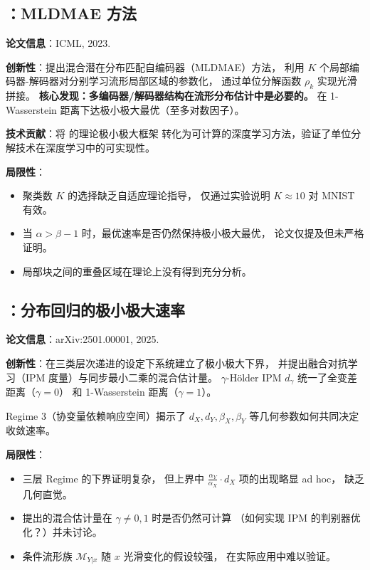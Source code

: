 \subsection{\citep{tang2023lowdim}：MLDMAE 方法}\label{sec:ch0-icml2023}

\textbf{论文信息}：ICML, 2023.

\textbf{创新性}：提出混合潜在分布匹配自编码器（MLDMAE）方法，
利用 $K$ 个局部编码器-解码器对分别学习流形局部区域的参数化，
通过单位分解函数 $\rho_k$ 实现光滑拼接。
\textbf{核心发现：多编码器/解码器结构在流形分布估计中是必要的。}
在 1-Wasserstein 距离下达极小极大最优（至多对数因子）。

\textbf{技术贡献}：将 \citep{tang2022minimax} 的理论极小极大框架
转化为可计算的深度学习方法，验证了单位分解技术在深度学习中的可实现性。

\textbf{局限性}：

\begin{itemize}
    \item 聚类数 $K$ 的选择缺乏自适应理论指导，
          仅通过实验说明 $K\approx 10$ 对 MNIST 有效。
    \item 当 $\alpha > \beta-1$ 时，最优速率是否仍然保持极小极大最优，
          论文仅提及但未严格证明。
    \item 局部块之间的重叠区域在理论上没有得到充分分析。
\end{itemize}

\subsection{\citep{tang2025regression}：分布回归的极小极大速率}\label{sec:ch0-arxiv2025a}

\textbf{论文信息}：arXiv:2501.00001, 2025.

\textbf{创新性}：在三类层次递进的设定下系统建立了极小极大下界，
并提出融合对抗学习（IPM 度量）与同步最小二乘的混合估计量。
$\gamma$-Hölder IPM $d_\gamma$ 统一了全变差距离（$\gamma=0$）
和 1-Wasserstein 距离（$\gamma=1$）。

Regime 3（协变量依赖响应空间）揭示了 $d_X, d_Y, \beta_X, \beta_Y$
等几何参数如何共同决定收敛速率。

\textbf{局限性}：

\begin{itemize}
    \item 三层 Regime 的下界证明复杂，
          但上界中 $\frac{\alpha_Y}{\alpha_X}\cdot d_X$ 项的出现略显 ad hoc，
          缺乏几何直觉。
    \item 提出的混合估计量在 $\gamma\neq 0,1$ 时是否仍然可计算
         （如何实现 IPM 的判别器优化？）并未讨论。
    \item 条件流形族 $\mathcal{M}_{Y|x}$ 随 $x$ 光滑变化的假设较强，
          在实际应用中难以验证。
\end{itemize}

